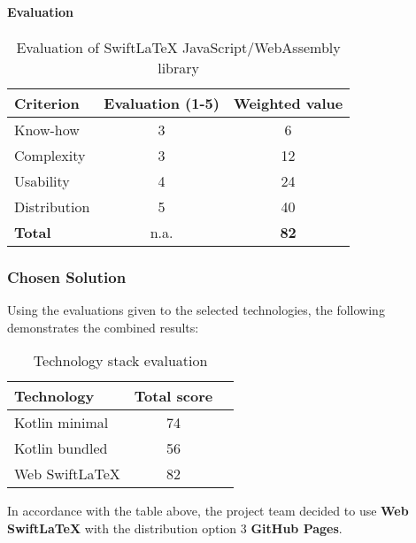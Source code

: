 \paragraph{Evaluation}
\begin{table}[H]
    \centering
    \begin{tabular}{l c c}
        \toprule
        \textbf{Criterion} & \textbf{Evaluation (1{-}5)} & \textbf{Weighted value} \\
        \midrule
        Know-how           & 3                           & 6                       \\
        \midrule
        Complexity         & 3                           & 12                      \\
        \midrule
        Usability          & 4                           & 24                      \\
        \midrule
        Distribution       & 5                           & 40                      \\
        \midrule
        \textbf{Total}     & n.a.                        & \textbf{82}             \\
        \bottomrule
    \end{tabular}
    \caption{Evaluation of SwiftLaTeX JavaScript/WebAssembly library}\label{table:SwiftLaTeX_evaluation}
\end{table}

\subsubsection{Chosen Solution}
Using the evaluations given to the selected technologies, the following demonstrates the combined results:
\begin{table}[H]
    \centering
    \begin{tabular}{l c c}
        \toprule
        \textbf{Technology} & \textbf{Total score} \\
        \midrule
        Kotlin minimal      & 74                   \\
        \midrule
        Kotlin bundled      & 56                   \\
        \midrule
        Web SwiftLaTeX      & 82                   \\
        \bottomrule
    \end{tabular}
    \caption{Technology stack evaluation}\label{table:technology_evaluation}
\end{table}
In accordance with the table above, the project team decided to use \textbf{Web SwiftLaTeX} with the distribution option 3 \textbf{GitHub Pages}.

